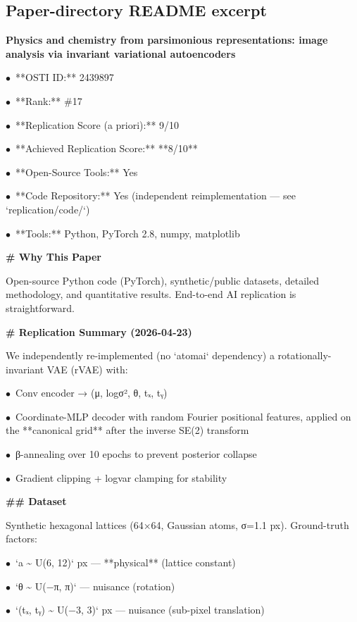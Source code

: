 \documentclass[11pt]{article}
\begin{document}
\subsection*{Paper-directory README excerpt}
\small
\par\medskip\textbf{Physics and chemistry from parsimonious representations: image analysis via invariant variational autoencoders}\par
\par$\bullet$\ **OSTI ID:** 2439897
\par$\bullet$\ **Rank:** \#17
\par$\bullet$\ **Replication Score (a priori):** 9/10
\par$\bullet$\ **Achieved Replication Score:** **8/10**
\par$\bullet$\ **Open-Source Tools:** Yes
\par$\bullet$\ **Code Repository:** Yes (independent reimplementation — see `replication/code/`)
\par$\bullet$\ **Tools:** Python, PyTorch 2.8, numpy, matplotlib

\par\medskip\textbf{\# Why This Paper}\par
Open-source Python code (PyTorch), synthetic/public datasets, detailed
methodology, and quantitative results. End-to-end AI replication is
straightforward.

\par\medskip\textbf{\# Replication Summary (2026-04-23)}\par

We independently re-implemented (no `atomai` dependency) a
rotationally-invariant VAE (rVAE) with:
\par$\bullet$\ Conv encoder → (μ, logσ², θ, tₓ, tᵧ)
\par$\bullet$\ Coordinate-MLP decoder with random Fourier positional features, applied
  on the **canonical grid** after the inverse SE(2) transform
\par$\bullet$\ β-annealing over 10 epochs to prevent posterior collapse
\par$\bullet$\ Gradient clipping + logvar clamping for stability

\par\medskip\textbf{\#\# Dataset}\par
Synthetic hexagonal lattices (64×64, Gaussian atoms, σ=1.1 px).
Ground-truth factors:
\par$\bullet$\ `a \textasciitilde{} U(6, 12)` px   — **physical** (lattice constant)
\par$\bullet$\ `θ \textasciitilde{} U(−π, π)`       — nuisance (rotation)
\par$\bullet$\ `(tₓ, tᵧ) \textasciitilde{} U(−3, 3)` px — nuisance (sub-pixel translation)
\end{document}
